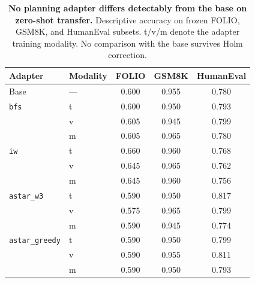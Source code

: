 \begin{table}[t]
\caption{\textbf{No planning adapter differs detectably from the base on zero-shot transfer.} Descriptive accuracy on frozen FOLIO, GSM8K, and HumanEval subsets. t/v/m denote the adapter training modality. No comparison with the base survives Holm correction.}
\label{tab:results-transfer}
\centering\footnotesize
\setlength{\tabcolsep}{5pt}
\begin{tabular}{@{}llccc@{}}
\toprule[0.4mm]
\rowcolor{mygray}\textbf{Adapter} & \textbf{Modality} & \textbf{FOLIO} & \textbf{GSM8K} & \textbf{HumanEval} \\
\midrule
Base & --- & 0.600 & 0.955 & 0.780 \\
\midrule
\texttt{bfs} & t & 0.600 & 0.950 & 0.793 \\
 & v & 0.605 & 0.945 & 0.799 \\
 & m & 0.605 & 0.965 & 0.780 \\
\midrule
\texttt{iw} & t & 0.660 & 0.960 & 0.768 \\
 & v & 0.645 & 0.965 & 0.762 \\
 & m & 0.645 & 0.960 & 0.756 \\
\midrule
\texttt{astar\_w3} & t & 0.590 & 0.950 & 0.817 \\
 & v & 0.575 & 0.965 & 0.799 \\
 & m & 0.590 & 0.945 & 0.774 \\
\midrule
\texttt{astar\_greedy} & t & 0.590 & 0.950 & 0.799 \\
 & v & 0.590 & 0.955 & 0.811 \\
 & m & 0.590 & 0.950 & 0.793 \\
\bottomrule
\end{tabular}
\end{table}

